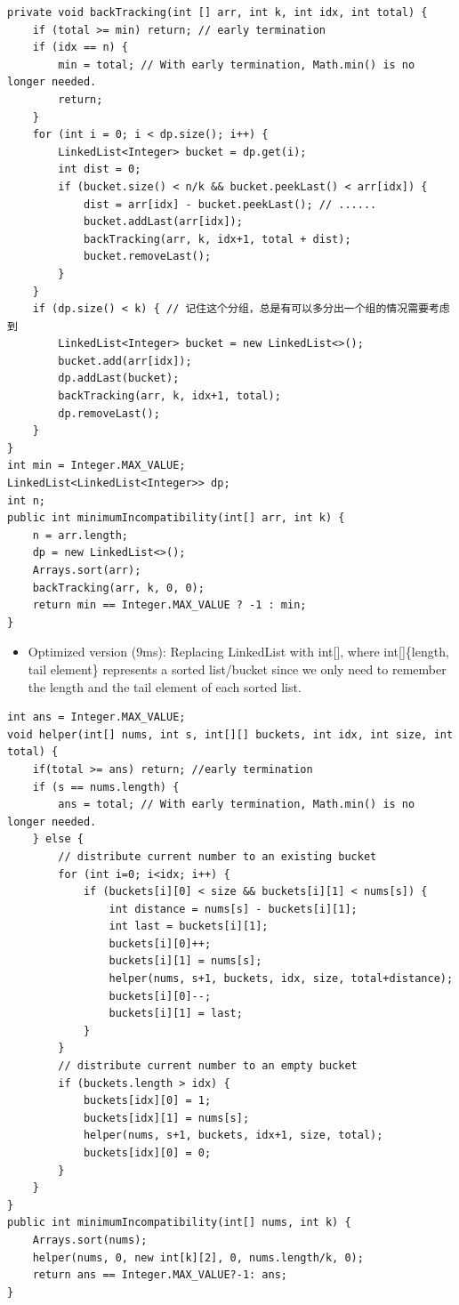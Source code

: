 \documentclass[9pt, b5paper]{article}
\begin{document}
\begin{verbatim}
private void backTracking(int [] arr, int k, int idx, int total) {
    if (total >= min) return; // early termination
    if (idx == n) {
        min = total; // With early termination, Math.min() is no longer needed.
        return;
    }
    for (int i = 0; i < dp.size(); i++) {
        LinkedList<Integer> bucket = dp.get(i);
        int dist = 0;
        if (bucket.size() < n/k && bucket.peekLast() < arr[idx]) {
            dist = arr[idx] - bucket.peekLast(); // ......
            bucket.addLast(arr[idx]);
            backTracking(arr, k, idx+1, total + dist);
            bucket.removeLast();
        }
    }
    if (dp.size() < k) { // 记住这个分组，总是有可以多分出一个组的情况需要考虑到
        LinkedList<Integer> bucket = new LinkedList<>();
        bucket.add(arr[idx]);
        dp.addLast(bucket);
        backTracking(arr, k, idx+1, total);
        dp.removeLast();
    }
}
int min = Integer.MAX_VALUE;
LinkedList<LinkedList<Integer>> dp;
int n;
public int minimumIncompatibility(int[] arr, int k) {
    n = arr.length;
    dp = new LinkedList<>();
    Arrays.sort(arr);
    backTracking(arr, k, 0, 0);
    return min == Integer.MAX_VALUE ? -1 : min;
}
\end{verbatim}
\begin{itemize}
\item Optimized version (9ms): Replacing LinkedList with int[], where int[]\{length, tail element\} represents a sorted list/bucket since we only need to remember the length and the tail element of each sorted list.
\end{itemize}
\begin{verbatim}
int ans = Integer.MAX_VALUE;
void helper(int[] nums, int s, int[][] buckets, int idx, int size, int total) {
    if(total >= ans) return; //early termination
    if (s == nums.length) {
        ans = total; // With early termination, Math.min() is no longer needed.
    } else {
        // distribute current number to an existing bucket
        for (int i=0; i<idx; i++) {
            if (buckets[i][0] < size && buckets[i][1] < nums[s]) {
                int distance = nums[s] - buckets[i][1];
                int last = buckets[i][1];
                buckets[i][0]++;
                buckets[i][1] = nums[s];
                helper(nums, s+1, buckets, idx, size, total+distance);
                buckets[i][0]--;
                buckets[i][1] = last;
            }
        }
        // distribute current number to an empty bucket
        if (buckets.length > idx) {
            buckets[idx][0] = 1;
            buckets[idx][1] = nums[s];
            helper(nums, s+1, buckets, idx+1, size, total);
            buckets[idx][0] = 0;
        }
    }
}
public int minimumIncompatibility(int[] nums, int k) {
    Arrays.sort(nums);
    helper(nums, 0, new int[k][2], 0, nums.length/k, 0);
    return ans == Integer.MAX_VALUE?-1: ans;
}
\end{verbatim}
\end{document}
